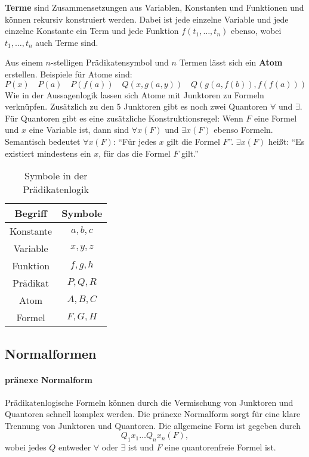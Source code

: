 \textbf{Terme} sind Zusammensetzungen aus Variablen, Konstanten und Funktionen und können rekursiv konstruiert werden. Dabei ist jede einzelne Variable und jede einzelne Konstante ein Term und jede Funktion $f(t_1,\ldots,t_n)$ ebenso, wobei $t_1,\ldots,t_n$ auch Terme sind.

Aus einem $n$-stelligen Prädikatensymbol und $n$ Termen lässt sich ein \textbf{Atom} erstellen. Beispiele für Atome sind:
$$P(x) \quad P(a) \quad P(f(a)) \quad Q(x, g(a,y)) \quad Q(g(a,f(b)), f(f(a)))$$
Wie in der Aussagenlogik lassen sich Atome mit Junktoren zu Formeln verknüpfen. Zusätzlich zu den 5 Junktoren gibt es noch zwei Quantoren $\forall$ und $\exists$. Für Quantoren gibt es eine zusätzliche Konstruktionsregel:
Wenn $F$ eine Formel und $x$ eine Variable ist, dann sind $\forall x(F)$ und $\exists x(F)$ ebenso Formeln.
Semantisch bedeutet $\forall x(F)$: "`Für jedes $x$ gilt die Formel $F$"'.  $\exists x(F)$ heißt: "`Es existiert mindestens ein $x$, für das die Formel $F$ gilt."'

\begin{table}
	\centering
	\begin{tabular}{|c|c|}
		\hline
		Begriff & Symbole \\ \hline\hline
		Konstante & $a,b,c$ \\\hline
		Variable & $x,y,z$ \\ \hline
		Funktion & $f, g, h$ \\\hline
		Prädikat & $P, Q, R$ \\\hline
		Atom & $A, B, C$ \\\hline
		Formel & $F, G, H$ \\\hline
	\end{tabular}
	\caption{Symbole in der Prädikatenlogik}
	\label{table:symbole}
\end{table}

\subsection{Normalformen}
\paragraph{pränexe Normalform} Prädikatenlogische Formeln können durch die Vermischung von Junktoren und Quantoren schnell komplex werden. Die pränexe Normalform sorgt für eine klare Trennung von Junktoren und Quantoren. Die allgemeine Form ist gegeben durch
$$Q_1x_1\ldots Q_nx_n(F),$$
wobei jedes $Q$ entweder $\forall$ oder $\exists$ ist und $F$ eine quantorenfreie Formel ist.
